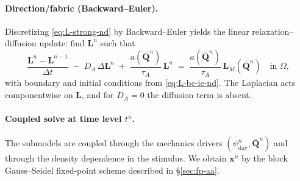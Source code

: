 \paragraph{Direction/fabric (Backward--Euler).}
Discretizing \eqref{eq:L-strong-nd} by Backward--Euler yields the linear relaxation--diffusion update: find $\mathbf{L}^n$ such that
\begin{equation}\label{eq:be-A}
\frac{\mathbf{L}^{n}-\mathbf{L}^{n-1}}{\Delta t}\;-\;D_A\,\Delta \mathbf{L}^{n}\;+\;\frac{a(\bar{\mathbf{Q}}^{n})}{\tau_A}\,\mathbf{L}^{n}
\;=\;\frac{a(\bar{\mathbf{Q}}^{n})}{\tau_A}\,\mathbf{L}_M(\bar{\mathbf{Q}}^{n})\quad\text{in }\Omega,
\end{equation}
with boundary and initial conditions from \eqref{eq:L-bc-ic-nd}. The Laplacian acts componentwise on $\mathbf{L}$, and for $D_A=0$ the diffusion term is absent.

\paragraph{Coupled solve at time level $t^n$.}
The submodels are coupled through the mechanics drivers $(\psi_{\mathrm{day}}^n,\bar{\mathbf{Q}}^n)$ and through the density dependence in the stimulus. We obtain $\mathbf{x}^n$ by the block Gauss--Seidel fixed-point scheme described in \S\ref{sec:fp-aa}.
